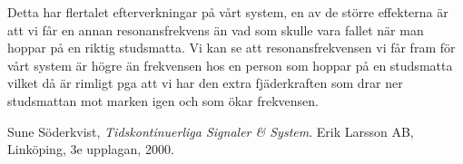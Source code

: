 \documentclass[10pt,a4paper]{article}
\begin{document}
Detta har flertalet efterverkningar på vårt system, en av de större effekterna är att vi får en annan resonansfrekvens än vad som skulle vara fallet när man hoppar på en riktig studsmatta. Vi kan se att resonansfrekvensen vi får fram för vårt system är högre än frekvensen hos en person som hoppar på en studsmatta vilket då är rimligt pga att vi har den extra fjäderkraften som drar ner studsmattan mot marken igen och som ökar frekvensen.



\newpage

\begin{thebibliography}{9}

  Sune Söderkvist,
  \emph{Tidskontinuerliga Signaler \& System}.
  \linebreak
  Erik Larsson AB, Linköping,
  3e upplagan,
  2000.

\end{thebibliography}
\end{document}
